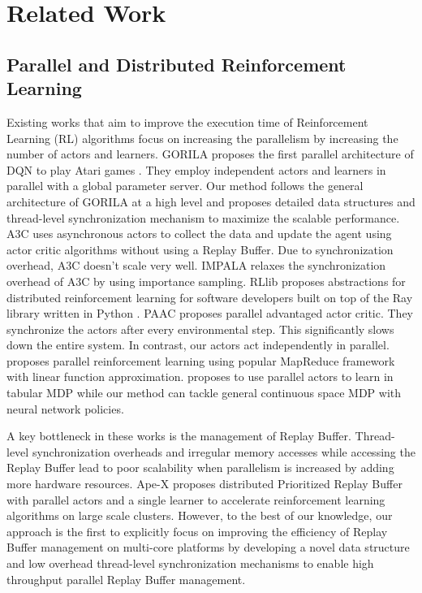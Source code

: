 \section{Related Work}
\subsection{Parallel and Distributed Reinforcement Learning}
Existing works that aim to improve the execution time of Reinforcement Learning (RL) algorithms focus on increasing the parallelism by increasing the number of actors and learners. GORILA \cite{gorila} proposes the first parallel architecture of DQN \cite{dqn} to play Atari games \cite{openai_gym}. 
They employ independent actors and learners in parallel with a global parameter server. 
Our method follows the general architecture of GORILA \cite{gorila} at a high level and proposes detailed data structures and thread-level synchronization mechanism to maximize the scalable performance. A3C \cite{a3c} uses asynchronous actors to collect the data and update the agent using actor critic algorithms without using a Replay Buffer. Due to synchronization overhead, A3C doesn't scale very well. IMPALA \cite{impala} relaxes the synchronization overhead of A3C by using importance sampling. RLlib \cite{ray_rllib} proposes abstractions for distributed reinforcement learning for software developers built on top of the Ray library \cite{ray_rllib} written in Python \cite{python}. PAAC \cite{paac} proposes parallel advantaged actor critic. They synchronize the actors after every environmental step. This significantly slows down the entire system. In contrast, our actors act independently in parallel.
\cite{map_reduce_parallel_rl} proposes parallel reinforcement learning using popular MapReduce \cite{map_reduce} framework with linear function approximation.
\cite{parallel_rl} proposes to use parallel actors to learn in tabular MDP while our method can tackle general continuous space MDP with neural network policies. 

A key bottleneck in these works is the management of Replay Buffer. Thread-level synchronization overheads and irregular memory accesses while accessing the Replay Buffer lead to poor scalability when parallelism is increased by adding more hardware resources. Ape-X \cite{apex} proposes distributed Prioritized Replay Buffer with parallel actors and a single learner to accelerate reinforcement learning algorithms on large scale clusters. However, to the best of our knowledge, our approach is the first to explicitly focus on improving the efficiency of Replay Buffer management on multi-core platforms by developing a novel data structure and low overhead thread-level synchronization mechanisms to enable high throughput parallel Replay Buffer management.


